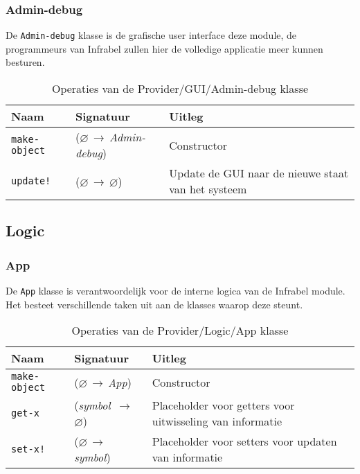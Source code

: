 \documentclass[a4paper, 11pt]{article}
\newcommand{\naar}{\,$\rightarrow$\,}
\renewcommand{\empty}{$\varnothing$}
\newcommand{\<}{\scriptsize\textless\normalsize}
\renewcommand{\>}{\scriptsize\textgreater\normalsize}
\begin{document}
\newpage

\subsubsection{Admin-debug} %
De \texttt{Admin-debug} klasse is de grafische user interface deze module, de programmeurs van Infrabel zullen hier de volledige applicatie meer kunnen besturen.
\begin{table}[H]
	\begin{center}
		{
		\begin{tabular}{|l l l|}
			\hline
			\textbf{Naam} & \textbf{Signatuur} & \textbf{Uitleg}\\
			\hline
			\texttt{make-object} & (\empty \naar \textit{Admin-debug}) & Constructor\\
			\hline
			\texttt{update!} & (\empty \naar \empty) & Update de GUI naar de nieuwe staat van het systeem\\
			\hline
		\end{tabular}}
		\caption{Operaties van de Provider/GUI/Admin-debug klasse}
	\end{center}
\end{table}

\subsection{Logic} %

\subsubsection{App} %
De \texttt{App} klasse is verantwoordelijk voor de interne logica van de Infrabel module. Het besteet verschillende taken uit aan de klasses waarop deze steunt.
\begin{table}[H]
	\begin{center}
		{
		\begin{tabular}{|l l l|}
			\hline
			\textbf{Naam} & \textbf{Signatuur} & \textbf{Uitleg}\\
			\hline
			\texttt{make-object} & (\empty \naar \textit{App}) & Constructor\\
			\hline
			\texttt{get-x} & (\textit{symbol} \naar \empty) & Placeholder voor getters voor uitwisseling van informatie\\
			\texttt{set-x!} & (\empty \naar \textit{symbol}) & Placeholder voor setters voor updaten van informatie\\
			\hline
		\end{tabular}}
		\caption{Operaties van de Provider/Logic/App klasse}
	\end{center}
\end{table}
\end{document}
